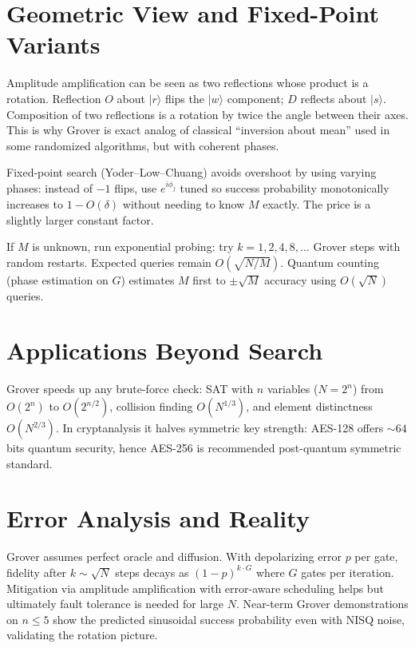 \section{Geometric View and Fixed-Point Variants}
Amplitude amplification can be seen as two reflections whose product is a rotation. Reflection $O$ about $\lvert r\rangle$ flips the $\lvert w\rangle$ component; $D$ reflects about $\lvert s\rangle$. Composition of two reflections is a rotation by twice the angle between their axes. This is why Grover is exact analog of classical ``inversion about mean'' used in some randomized algorithms, but with coherent phases.

Fixed-point search (Yoder--Low--Chuang) avoids overshoot by using varying phases: instead of $-1$ flips, use $e^{i\phi_j}$ tuned so success probability monotonically increases to $1-O(\delta)$ without needing to know $M$ exactly. The price is a slightly larger constant factor.

\begin{example}
If $M$ is unknown, run exponential probing: try $k=1,2,4,8,\dots$ Grover steps with random restarts. Expected queries remain $O(\sqrt{N/M})$. Quantum counting (phase estimation on $G$) estimates $M$ first to $\pm\sqrt M$ accuracy using $O(\sqrt N)$ queries.
\end{example}

\section{Applications Beyond Search}
Grover speeds up any brute-force check: SAT with $n$ variables ($N=2^n$) from $O(2^n)$ to $O(2^{n/2})$, collision finding $O(N^{1/3})$, and element distinctness $O(N^{2/3})$. In cryptanalysis it halves symmetric key strength: AES-128 offers $\sim64$ bits quantum security, hence AES-256 is recommended post-quantum symmetric standard.


\section{Error Analysis and Reality}
Grover assumes perfect oracle and diffusion. With depolarizing error $p$ per gate, fidelity after $k\sim\sqrt N$ steps decays as $(1-p)^{k\cdot G}$ where $G$ gates per iteration. Mitigation via amplitude amplification with error-aware scheduling helps but ultimately fault tolerance is needed for large $N$. Near-term Grover demonstrations on $n\le5$ show the predicted sinusoidal success probability even with NISQ noise, validating the rotation picture.


